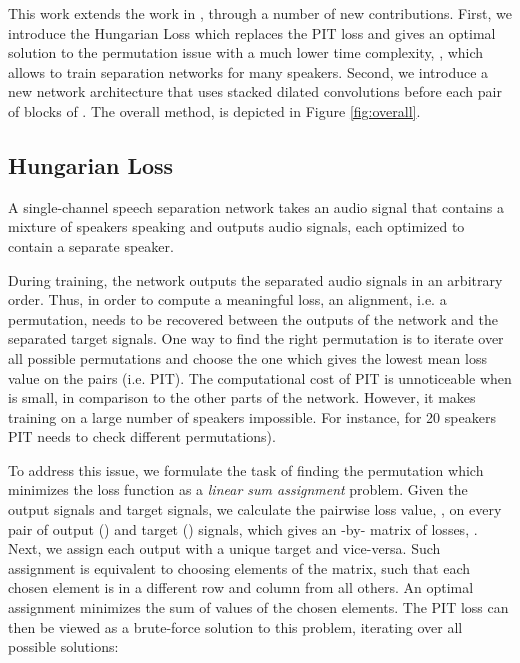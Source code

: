 \documentclass[a4paper]{article}
\begin{document}
This work extends the work in \cite{nachmani2020voice}, through a number of new contributions. First, we introduce the Hungarian Loss which replaces the PIT loss and gives an optimal solution to the permutation issue with a much lower time complexity, , which allows to train separation networks for many speakers. Second, we introduce a new network architecture that uses stacked dilated convolutions before each pair of  blocks of \cite{nachmani2020voice}. The overall method, is depicted in Figure \ref{fig:overall}.

\vspace{-0.1cm}
\subsection{Hungarian Loss}
A single-channel speech separation network takes an audio signal that contains a mixture of  speakers speaking and outputs  audio signals, each optimized to contain a separate speaker.

During training, the network outputs the separated audio signals in an arbitrary order. Thus, in order to compute a meaningful loss, an alignment, i.e. a permutation, needs to be recovered between the outputs of the network and the separated target signals.  One way to find the right permutation is to iterate over all possible  permutations and choose the one which gives the lowest mean loss value on the pairs (i.e. PIT). The computational cost of PIT is unnoticeable when  is small, in comparison to the other parts of the network. However, it makes training on a large number of speakers impossible. For instance, for 20 speakers PIT needs to check  different permutations).

To address this issue, we formulate the task of finding the permutation which minimizes the loss function as a \textit{linear sum assignment} problem. Given the  output signals and  target signals, we calculate the pairwise loss value, , on every pair of output () and target () signals, which gives an -by- matrix of losses, . Next, we assign each output with a unique target and vice-versa. Such assignment is equivalent to choosing  elements of the matrix, such that each chosen element is in a different row and column from all others. An optimal assignment minimizes the sum of values of the chosen elements. The PIT loss can then be viewed as a brute-force solution to this problem, iterating over all possible solutions:

\vspace{-0.3cm}
\end{document}
